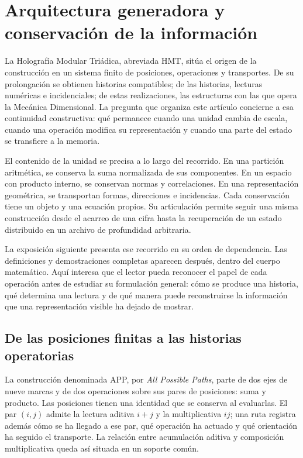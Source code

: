 \section*{Arquitectura generadora y conservación de la información}
\label{libnar:troncal}

La Holografía Modular Triádica, abreviada HMT, sitúa el origen de la
construcción en un sistema finito de posiciones, operaciones y transportes.
De su prolongación se obtienen historias compatibles; de las historias,
lecturas numéricas e incidenciales; de estas realizaciones, las estructuras
con las que opera la Mecánica Dimensional. La pregunta que organiza este
artículo concierne a esa continuidad constructiva: qué permanece cuando una
unidad cambia de escala, cuando una operación modifica su representación
y cuando una parte del estado se transfiere a la memoria.

El contenido de la unidad se precisa a lo largo del recorrido. En una
partición aritmética, se conserva la suma normalizada de sus componentes.
En un espacio con producto interno, se conservan normas y correlaciones.
En una representación geométrica, se transportan formas, direcciones e
incidencias. Cada conservación tiene un objeto y una ecuación propios.
Su articulación permite seguir una misma construcción desde el acarreo
de una cifra hasta la recuperación de un estado distribuido en un archivo
de profundidad arbitraria.

La exposición siguiente presenta ese recorrido en su orden de dependencia.
Las definiciones y demostraciones completas aparecen después, dentro del
cuerpo matemático. Aquí interesa que el lector pueda reconocer el papel
de cada operación antes de estudiar su formulación general: cómo se
produce una historia, qué determina una lectura y de qué manera puede
reconstruirse la información que una representación visible ha dejado
de mostrar.

\subsection*{De las posiciones finitas a las historias operatorias}
\label{libnar:app}

La construcción denominada APP, por \emph{All Possible Paths}, parte de
dos ejes de nueve marcas y de dos operaciones sobre sus pares de
posiciones: suma y producto. Las posiciones tienen una identidad que se
conserva al evaluarlas. El par \((i,j)\) admite la lectura aditiva
\(i+j\) y la multiplicativa \(ij\); una ruta registra además cómo se
ha llegado a ese par, qué operación ha actuado y qué orientación ha
seguido el transporte. La relación entre acumulación aditiva y
composición multiplicativa queda así situada en un soporte común.

